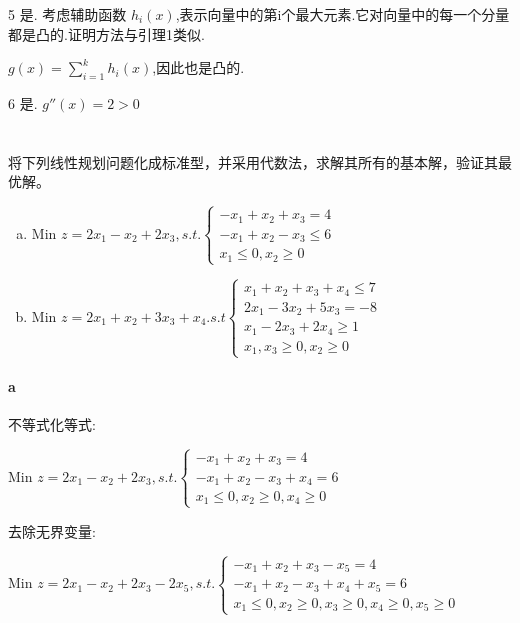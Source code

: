 \documentclass[a4paper]{article}
\begin{document}
5 是. 考虑辅助函数 $h_i(x)$,表示向量中的第i个最大元素.它对向量中的每一个分量都是凸的.证明方法与引理1类似.

$g(x) = \sum_{i=1}^k h_i(x)$,因此也是凸的.

6 是.  $g''(x) = 2 > 0$

\section{}
将下列线性规划问题化成标准型，并采用代数法，求解其所有的基本解，验证其最优解。  

\begin{enumerate}[a)]
    \item Min $z = 2x_1 - x_2 + 2x_3, s.t. \left\{ \begin{aligned}
        -x_1 + x_2 + x_3 = 4 \\
        -x_1 + x_2 - x_3 \leq 6\\
        x_1 \leq 0, x_2 \geq 0
    \end{aligned}\right.$
    \item Min $z = 2x_1 + x_2 + 3x_3 + x_4. s.t \left\{\begin{aligned}
        x_1 + x_2 + x_3 + x_4 \leq 7 \\
        2x_1 - 3x_2 + 5x_3 = -8\\
        x_1 - 2x_3 + 2x_4 \geq 1 \\
        x_1,x_3 \geq 0, x_2 \geq 0
    \end{aligned}\right.$
\end{enumerate}

\paragraph{a}
不等式化等式:

Min \(z=2x_1-x_2+2x_3 , s.t. \left\{\begin{aligned}
  -x_1+x_2+x_3=4 \\
  -x_1+x_2-x_3+x_4=6 \\
x_1 \leq 0,x_2 \geq 0,x_4 \geq 0
\end{aligned}\right.\)

去除无界变量:

Min \(z=2x_1-x_2+2x_3-2x_5 , s.t. \left\{\begin{aligned}
  -x_1+x_2+x_3-x_5=4 \\
  -x_1+x_2-x_3+x_4+x_5=6 \\
x_1 \leq 0,x_2 \geq 0,x_3 \geq 0,x_4 \geq 0,x_5 \geq 0
\end{aligned}\right.\)
\end{document}

